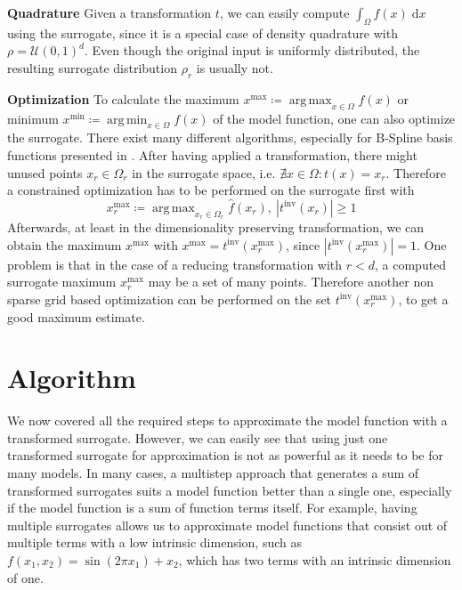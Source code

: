\documentclass[
  a4paper,  %
  twoside,  %
  bibliography=totoc,
  headsepline,
  cleardoublepage=empty,
  parskip=half,
  draft=false
]{scrbook}
\DeclareMathOperator*{\argmin}{arg\,min}
\DeclareMathOperator*{\argmax}{arg\,max}
\begin{document}
\vspace{1em}
\textbf{Quadrature}
Given a transformation $t$, we can easily compute $\int_{\Omega} f(x) \; \text{d}x$ using the surrogate, since it is a special case of density quadrature with $\rho=\mathcal{U}(0,1)^d$.
Even though the original input is uniformly distributed, the resulting surrogate distribution $\rho_r$ is usually not.

\vspace{1em}
\textbf{Optimization}
To calculate the maximum $x^\text{max} \coloneqq \argmax_{x \in \Omega} f(x)$ or minimum $x^\text{min} \coloneqq \argmin_{x \in \Omega} f(x)$ of the model function, one can also optimize the surrogate. There exist many different algorithms, especially for B-Spline basis functions presented in \cite{}.
After having applied a transformation, there might unused points $x_r \in \Omega_r$ in the surrogate space, i.e. $\nexists x \in \Omega \colon t(x)=x_r$.
Therefore a constrained optimization has to be performed on the surrogate first with
\begin{equation}
x_{r}^\text{max} \coloneqq \argmax_{x_r \in \Omega_r} \hat{f}(x_r), ~ |t^{\text{inv}}(x_{r})|\geq 1
\end{equation}
Afterwards, at least in the dimensionality preserving transformation, we can obtain the maximum $x^\text{max}$ with $x^\text{max}=t^{\text{inv}}(x_{r}^\text{max})$, since $|t^{\text{inv}}(x_{r}^\text{max})|=1$.
One problem is that in the case of a reducing transformation with $r<d$, a computed surrogate maximum $x_{r}^\text{max}$ may be a set of many points.
Therefore another non sparse grid based optimization can be performed on the set $t^{\text{inv}}(x_{r}^\text{max})$, to get a good maximum estimate.

\chapter{Algorithm}
\label{chap:c5}

We now covered all the required steps to approximate the model function with a transformed surrogate.
However, we can easily see that using just one transformed surrogate for approximation is not as powerful as it needs to be for many models.
In many cases, a multistep approach that generates a sum of transformed surrogates suits a model function better than a single one, especially if the model function is a sum of function terms itself.
For example, having multiple surrogates allows us to approximate model functions that consist out of multiple terms with a low intrinsic dimension, such as $f(x_1, x_2)=\sin(2 \pi x_1) + x_2$, which has two terms with an intrinsic dimension of one.
\end{document}
